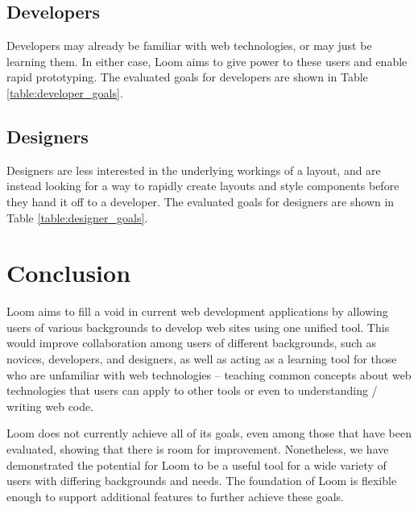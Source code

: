 \documentclass[conference, letterpaper]{IEEEtran}
\begin{document}
\subsection{Developers}
Developers may already be familiar with web technologies, or may just be learning them. In either case, Loom aims to give power to these users and enable rapid prototyping. The evaluated goals for developers are shown in Table \ref{table:developer_goals}.

\subsection{Designers}
Designers are less interested in the underlying workings of a layout, and are instead looking for a way to rapidly create layouts and style components before they hand it off to a developer. The evaluated goals for designers are shown in Table \ref{table:designer_goals}.


\section{Conclusion}
Loom aims to fill a void in current web development applications by allowing users of various backgrounds to develop web sites using one unified tool. This would improve collaboration among users of different backgrounds, such as novices, developers, and designers, as well as acting as a learning tool for those who are unfamiliar with web technologies -- teaching common concepts about web technologies that users can apply to other tools or even to understanding / writing web code.

Loom does not currently achieve all of its goals, even among those that have been evaluated, showing that there is room for improvement. Nonetheless, we have demonstrated the potential for Loom to be a useful tool for a wide variety of users with differing backgrounds and needs. The foundation of Loom is flexible enough to support additional features to further achieve these goals.
\end{document}

